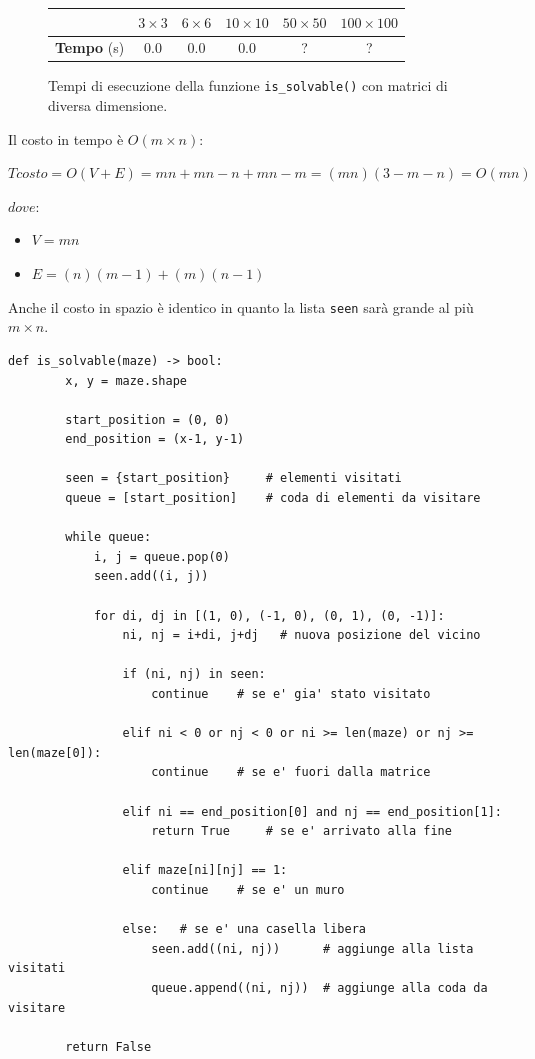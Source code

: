 \begin{figure}[H]
	\centering
   	\begin{tabular}{c | c | c | c | c | c}
		 & $3 \times 3$ & $6 \times 6$ & $10 \times 10$ & $50 \times 50$ & $100 \times 100$\\
		\hline
		\textbf{Tempo} (s) & 0.0 & 0.0 & 0.0 & ? & ?\\ [2em]
	\end{tabular}
	\caption{Tempi di esecuzione della funzione \lstinline[style=cmd]|is_solvable()| con matrici di diversa dimensione.}
\end{figure}

Il costo in tempo \`{e} $O(m \times n)$:

\begin{center}
	$Tcosto = O(V + E) = mn + mn - n + mn - m = (mn)(3 - m - n) = O(mn) $
\end{center}
$dove: $
\begin{itemize}
	\item $V = mn$
	\item $E = (n)(m-1) + (m)(n-1)$
\end{itemize}

Anche il costo in spazio \`{e} identico in quanto la lista \lstinline[style=cmd]|seen| sar\`{a} grande al pi\`{u} $m \times n$.

\begin{lstlisting}[style=python, caption={Funzione per controllare la risolvibilit\`{a} dei labirinti}]
	def is_solvable(maze) -> bool:
		x, y = maze.shape
		
		start_position = (0, 0)
		end_position = (x-1, y-1)

		seen = {start_position}     # elementi visitati
		queue = [start_position]    # coda di elementi da visitare
	
		while queue:
			i, j = queue.pop(0)
			seen.add((i, j))
	
			for di, dj in [(1, 0), (-1, 0), (0, 1), (0, -1)]:
				ni, nj = i+di, j+dj   # nuova posizione del vicino
				
				if (ni, nj) in seen:
					continue	# se e' gia' stato visitato
	
				elif ni < 0 or nj < 0 or ni >= len(maze) or nj >= len(maze[0]):
					continue	# se e' fuori dalla matrice
	
				elif ni == end_position[0] and nj == end_position[1]:
					return True		# se e' arrivato alla fine
	
				elif maze[ni][nj] == 1:
					continue	# se e' un muro
	
				else: 	# se e' una casella libera
					seen.add((ni, nj))      # aggiunge alla lista visitati
					queue.append((ni, nj))  # aggiunge alla coda da visitare
	
		return False
\end{lstlisting}
\pagebreak

